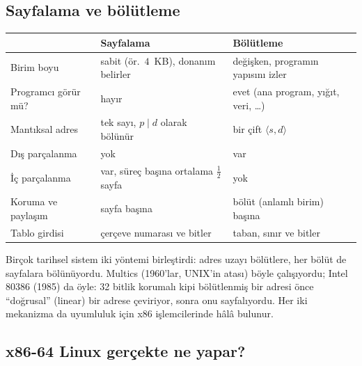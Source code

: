 \subsection{Sayfalama ve bölütleme}

\begin{center}
\renewcommand{\arraystretch}{1.3}
\begin{tabularx}{\linewidth}{>{\raggedright\arraybackslash}p{3.6cm} >{\raggedright\arraybackslash}X >{\raggedright\arraybackslash}X}
\toprule
 & \textbf{Sayfalama} & \textbf{Bölütleme} \\
\midrule
Birim boyu & sabit (ör.\ $4$~KB), donanım belirler & değişken, programın yapısını izler \\
Programcı görür mü? & hayır & evet (ana program, yığıt, veri, \dots) \\
Mantıksal adres & tek sayı, $p \mid d$ olarak bölünür & bir çift $\langle s, d\rangle$ \\
Dış parçalanma & yok & var \\
İç parçalanma & var, süreç başına ortalama $\tfrac12$ sayfa & yok \\
Koruma ve paylaşım & sayfa başına & bölüt (anlamlı birim) başına \\
Tablo girdisi & çerçeve numarası ve bitler & taban, sınır ve bitler \\
\bottomrule
\end{tabularx}
\end{center}

\begin{histnote}
Birçok tarihsel sistem iki yöntemi birleştirdi: adres uzayı bölütlere, her bölüt de sayfalara bölünüyordu. Multics (1960'lar, UNIX'in atası) böyle çalışıyordu; Intel 80386 (1985) da öyle: 32 bitlik korumalı kipi bölütlenmiş bir adresi önce ``doğrusal'' (linear) bir adrese çeviriyor, sonra onu sayfalıyordu. Her iki mekanizma da uyumluluk için x86 işlemcilerinde hâlâ bulunur.
\end{histnote}

\subsection{x86-64 Linux gerçekte ne yapar?}
\label{sec:x86}

